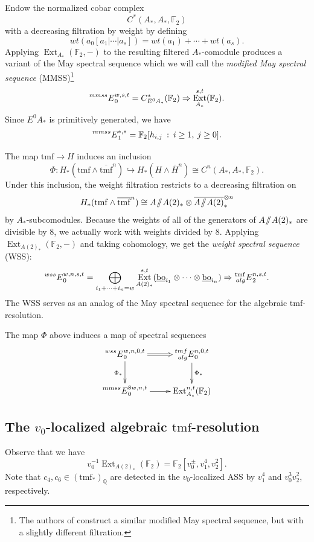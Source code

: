 \documentclass[10pt]{amsart}
\newcommand{\sslash}{\mathbin{/\mkern-6mu/}}
\newcommand{\mmod}{\! \sslash \!}
\newcommand{\ul}[1]{\underline{#1}}
\newcommand{\br}[1]{\overline{#1}}
\newcommand{\QQ}{\mathbb{Q}}
\newcommand{\FF}{\mathbb{F}}
\newcommand{\tmf}{\mathrm{tmf}}
\newcommand{\bo}{\mathrm{bo}}
\newcommand{\bou}{\ul{\bo}}
\theoremstyle{definition}
\numberwithin{equation}{section}
\numberwithin{figure}{section}
\DeclareMathOperator{\Ext}{Ext}
\newcommand{\E}[2]{\prescript{#1}{#2}{E}}
\begin{document}
Endow the normalized cobar complex 
$$ C^*(A_*,A_*,\FF_2) $$
with a decreasing filtration by weight by defining 
$$ wt(a_0[a_1|\cdots|a_s]) = wt(a_1)+\cdots+wt(a_s). $$
Applying $\Ext_{A_*}(\FF_2,-)$ to the resulting filtered $A_*$-comodule produces a variant of the May spectral sequence which we will call the \emph{modified May spectral sequence} (MMSS)\footnote{The authors of \cite{LSWX} construct a similar modified May spectral sequence, but with a slightly different filtration.}
\begin{equation}\label{eq:mmss}
 \E{mmss}{}^{w,s,t}_0 = C^*_{E^0 A_*}(\FF_2) \Rightarrow \Ext^{s,t}_{A_*}(\FF_2). 
 \end{equation}
Since $E^0A_*$ is primitively generated, we have
$$ \E{mmss}{}_1^{*,*} = \FF_2[h_{i,j} \: : \: i \ge 1, \: j \ge 0]. $$

The map $\tmf \rightarrow H$ induces an inclusion
$$ \Phi: H_*(\tmf \wedge \br{\tmf}^n) \hookrightarrow H_*(H \wedge \br{H}^n) \cong C^n(A_*,A_*,\FF_2). $$ 
Under this inclusion, the weight filtration restricts to a decreasing filtration on
$$ H_*(\tmf \wedge \br{\tmf}^n) \cong A\mmod A(2)_* \otimes \br{A \mmod A(2)}_*^{\otimes n}  $$
by $A_*$-subcomodules.
Because the weights of all of the generators of $A \mmod A(2)_*$ are divisible by 8, we actually work with weights divided by 8.  
Applying $\Ext_{A(2)_*}(\FF_2, -)$ and taking cohomology, we get 
the \emph{weight spectral sequence} (WSS):
$$ \E{wss}{}_0^{w,n,s,t} = \bigoplus_{i_1 + \cdots + i_n = w} \Ext_{A(2)_*}^{s,t}(\bou_{i_1} \otimes \cdots \otimes \bou_{i_n}) \Rightarrow \E{\tmf}{alg}^{n,s,t}_2. $$
The WSS serves as an analog of the May spectral sequence for the algebraic $\tmf$-resolution.

The map $\Phi$ above induces a map of spectral sequences
\begin{equation}\label{eq:Phi}
\xymatrix{
\E{wss}{}^{w,n,0,t}_0 \ar@{=>}[r] \ar[d]_{\Phi_*} & \E{tmf}{alg}_0^{n,0,t} 
\ar[d]^{\Phi_*} \\
\E{mmss}{}^{8w,n,t}_0 \ar[r] & \Ext^{n,t}_{A_*}(\FF_2)
}
\end{equation}

\subsection*{The $v_0$-localized algebraic $\tmf$-resolution}

Observe that we have
\begin{equation}\label{v0localExtA2}
v_0^{-1}\Ext_{A(2)_*}(\FF_2) = \FF_2[v_0^{\pm}, v_1^4, v_2^2].
\end{equation}
Note that $c_4, c_6 \in (\tmf_*)_\QQ$ are detected in the $v_0$-localized ASS by $v_1^4$ and $v_0^3v_2^2$, respectively.
\end{document}
